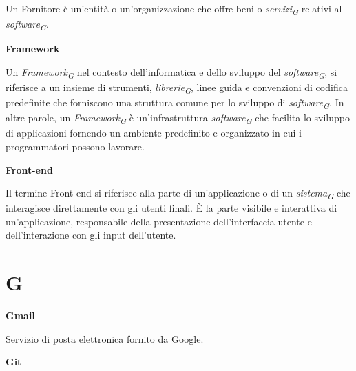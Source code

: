 \documentclass{article}
\begin{document}
Un Fornitore è un'entità o un'organizzazione che offre beni o \textit{servizi}\textsubscript{\textit{G}} relativi al \textit{software}\textsubscript{\textit{G}}.

\vspace{0.4cm}

\textbf{Framework}

\vspace{0.1cm}

Un \textit{Framework}\textsubscript{\textit{G}} nel contesto dell'informatica e dello sviluppo del \textit{software}\textsubscript{\textit{G}}, si riferisce a un insieme di strumenti, \textit{librerie}\textsubscript{\textit{G}}, linee guida e convenzioni di codifica predefinite che forniscono una struttura comune per lo sviluppo di \textit{software}\textsubscript{\textit{G}}. In altre parole, un \textit{Framework}\textsubscript{\textit{G}} è un'infrastruttura \textit{software}\textsubscript{\textit{G}} che facilita lo sviluppo di applicazioni fornendo un ambiente predefinito e organizzato in cui i programmatori possono lavorare.

\vspace{0.4cm}

\textbf{Front-end}

\vspace{0.1cm}

Il termine Front-end si riferisce alla parte di un'applicazione o di un \textit{sistema}\textsubscript{\textit{G}} che interagisce direttamente con gli utenti finali. È la parte visibile e interattiva di un'applicazione, responsabile della presentazione dell'interfaccia utente e dell'interazione con gli input dell'utente.

\pagebreak
\section*{G}
{}

\vspace{0.4cm}

\textbf{Gmail}

\vspace{0.1cm}

Servizio di posta elettronica fornito da Google.

\vspace{0.4cm}

\textbf{Git}

\vspace{0.1cm}
\end{document}
